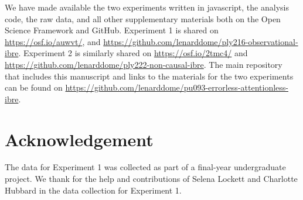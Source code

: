 \documentclass[10pt,letterpaper]{article}
\begin{document}
We have made available the two experiments written in javascript, the analysis code, the raw data, and all other supplementary materials both on the Open Science Framework and GitHub.
Experiment 1 is shared on \href{https://osf.io/auwvt/}{https://osf.io/auwvt/}, and \href{https://github.com/lenarddome/ply216-observational-ibre}{https://github.com/lenarddome/ply216-observational-ibre}.
Experiment 2 is similarly shared on \href{https://osf.io/2tmc4/}{https://osf.io/2tmc4/} and \href{https://github.com/lenarddome/ply222-non-causal-ibreBA}{https://github.com/lenarddome/ply222-non-causal-ibre}.
The main repository that includes this manuscript and links to the materials for the two experiments can be found on \href{https://github.com/lenarddome/pu093-errorless-attentionless-ibre}{https://github.com/lenarddome/pu093-errorless-attentionless-ibre}.

\section{Acknowledgement}

The data for Experiment 1 was collected as part of a final-year undergraduate project. We thank for the help and contributions of Selena Lockett and Charlotte Hubbard in the data collection for Experiment 1.



\setlength{\bibleftmargin}{.125in}
\setlength{\bibindent}{-\bibleftmargin}


\end{document}
